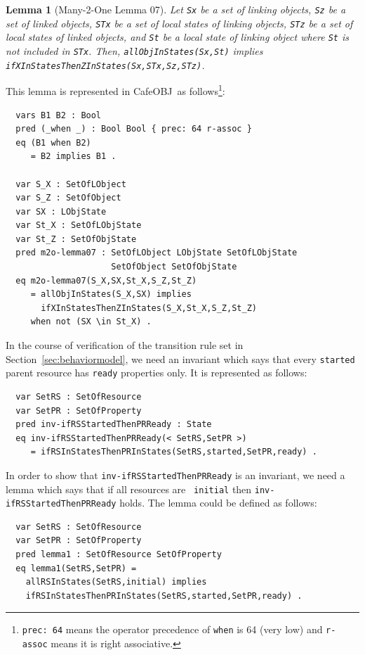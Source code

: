 \documentclass[12pt]{report}
\newtheorem{lemma}{Lemma}
\newcommand{\stt}[1]{{\small{\tt {#1}}}}
\newcommand{\cafeobj}{{\sf CafeOBJ}~}
\begin{document}
\begin{lemma}[Many-2-One Lemma 07]
  Let {\tt Sx} be a set of linking objects, {\tt Sz} be a set of
  linked objects, {\tt STx} be a set of local states of linking
  objects, {\tt STz} be a set of local states of linked objects, and
  {\tt St} be a local state of linking object where {\tt St} is not
  included in {\tt STx}. Then, \stt{allObjInStates(Sx,St)} implies
  \stt{ifXInStatesThenZInStates(Sx,STx,Sz,STz)}.
\end{lemma}
This lemma is represented in \cafeobj as follows\footnote{\stt{prec:~64} 
means the operator precedence of {\tt when} is 64 (very low) and 
{\tt r-assoc} means it is right associative.}:
\begin{verbatim}
  vars B1 B2 : Bool
  pred (_when _) : Bool Bool { prec: 64 r-assoc }
  eq (B1 when B2)
     = B2 implies B1 .

  var S_X : SetOfLObject
  var S_Z : SetOfObject
  var SX : LObjState
  var St_X : SetOfLObjState
  var St_Z : SetOfObjState
  pred m2o-lemma07 : SetOfLObject LObjState SetOfLObjState 
                     SetOfObject SetOfObjState
  eq m2o-lemma07(S_X,SX,St_X,S_Z,St_Z)
     = allObjInStates(S_X,SX) implies 
       ifXInStatesThenZInStates(S_X,St_X,S_Z,St_Z)
     when not (SX \in St_X) .
\end{verbatim}
In the course of verification of the transition rule set in
Section~\ref{sec:behaviormodel}, we need an invariant which says that
every {\tt started} parent resource has {\tt ready} properties
only. It is represented as follows:
\begin{verbatim}
  var SetRS : SetOfResource
  var SetPR : SetOfProperty
  pred inv-ifRSStartedThenPRReady : State
  eq inv-ifRSStartedThenPRReady(< SetRS,SetPR >)
     = ifRSInStatesThenPRInStates(SetRS,started,SetPR,ready) .
\end{verbatim}
In order to show that {\tt inv-ifRSStartedThenPRReady} is an
invariant, we need a lemma which says that if all resources are {\tt
  initial} then {\tt inv-ifRSStartedThenPRReady} holds.  The lemma
could be defined as follows:
\begin{verbatim}
  var SetRS : SetOfResource
  var SetPR : SetOfProperty
  pred lemma1 : SetOfResource SetOfProperty
  eq lemma1(SetRS,SetPR) =
    allRSInStates(SetRS,initial) implies
    ifRSInStatesThenPRInStates(SetRS,started,SetPR,ready) .
\end{verbatim}
\end{document}

